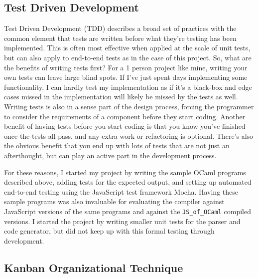 \documentclass[12pt,a4paper,twoside,openright]{report}
\newcommand{\JSofOCaml}{{\tt JS\_of\_OCaml} }
\begin{document}
\subsection{Test Driven Development}
Test Driven Development (TDD) describes a broad set of practices with the common element that tests are written before what they're testing has been implemented.
This is often most effective when applied at the scale of unit tests, but can also apply to end-to-end tests as in the case of this project.
So, what are the benefits of writing tests first?
For a 1 person project like mine, writing your own tests can leave large blind spots.
If I've just spent days implementing some functionality, I can hardly test my implementation as if it's a black-box and edge cases missed in the implementation will likely be missed by the tests as well.
Writing tests is also in a sense part of the design process, forcing the programmer to consider the requirements of a component before they start coding.
Another benefit of having tests before you start coding is that you know you've finished once the tests all pass, and any extra work or refactoring is optional.
There's also the obvious benefit that you end up with lots of tests that are not just an afterthought, but can play an active part in the development process.

For these reasons, I started my project by writing the sample OCaml programs described above, adding tests for the expected output, and setting up automated end-to-end testing using the JavaScript test framework Mocha.
Having these sample programs was also invaluable for evaluating the compiler against JavaScript versions of the same programs and against the \JSofOCaml compiled versions.
I started the project by writing smaller unit tests for the parser and code generator, but did not keep up with this formal testing through development.

\subsection{Kanban Organizational Technique}
\end{document}
